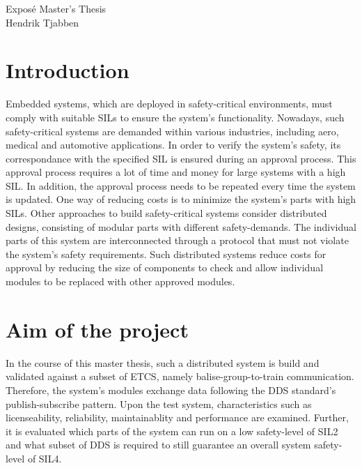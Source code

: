\documentclass[a4paper, 12pt]{scrartcl}
\begin{document}
\begin{center}
  \Huge{Expos\'{e} Master's Thesis}\\
\Large{Hendrik Tjabben}
\end{center}


\section*{Introduction}

Embedded systems, which are deployed in safety-critical environments, must comply with suitable \acp{SIL} to ensure the system's functionality.
Nowadays, such safety-critical systems are demanded within various industries, including aero, medical and automotive applications.
In order to verify the system's safety, its correspondance with the specified \ac{SIL} is ensured during an approval process.
This approval process requires a lot of time and money for large systems with a high \ac{SIL}.
In addition, the approval process needs to be repeated every time the system is updated.  One way of reducing costs is to minimize the system's parts with high \acp{SIL}.
Other approaches to build safety-critical systems consider distributed designs, consisting of modular parts with different safety-demands.
The individual parts of this system are interconnected through a protocol that must not violate the system's safety requirements.
Such distributed systems reduce costs for approval by reducing the size of components to check and allow individual modules to be replaced with other approved modules.

\section*{Aim of the project}

In the course of this master thesis, such a distributed system is build and validated against a subset of \ac{ETCS}, namely balise-group-to-train communication.
Therefore, the system's modules exchange data following the \ac{DDS} standard's publish-subscribe pattern.
Upon the test system, characteristics such as licenseability, reliability, maintainablity and performance are examined.
Further, it is evaluated which parts of the system can run on a low safety-level of \ac{SIL}2 and what subset of \ac{DDS} is required to still guarantee an overall system safety-level of \ac{SIL}4.
\end{document}
